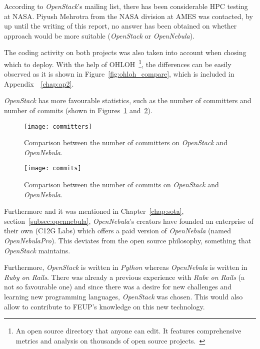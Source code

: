 According to \textit{OpenStack}'s mailing list, there has been considerable HPC testing at NASA. Piyush Mehrotra from the NASA division at AMES was contacted, by up until the writing of this report, no answer has been obtained on whether approach would be more suitable (\textit{OpenStack} or \textit{OpenNebula}).

The coding activity on both projects was also taken into account when chosing which to deploy. With the help of OHLOH~\footnote{An open source directory that anyone can edit. It features comprehensive metrics and analysis on thousands of open source projects.~\cite{ohloh}}, the differences can be easily observed as it is shown in Figure~\ref{fig:ohloh_compare}, which is included in Appendix~~\ref{chap:ap2}.

\textit{OpenStack} has more favourable statistics, such as the number of committers and number of commits (shown in Figures~\ref{fig:committers} and~\ref{fig:commits}).  

\begin{figure}[h]
  \begin{center} 
    \leavevmode 
    \texttt{[image: committers]}
    \caption{Comparison between the number of committers on \textit{OpenStack} and \textit{OpenNebula}.~\cite{ohloh}} 
    \label{fig:committers} 
  \end{center}
\end{figure}

\begin{figure}[h]
  \begin{center}
    \leavevmode
    \texttt{[image: commits]}
    \caption{Comparison between the number of commits on \textit{OpenStack} and \textit{OpenNebula}.~\cite{ohloh}}
    \label{fig:commits}
  \end{center}
\end{figure}

Furthermore and it was mentioned in Chapter~\ref{chap:sota}, section~\ref{subsec:opennebula}, \textit{OpenNebula}'s creators have founded an enterprise of their own (C12G Labs) which offers a paid version of \textit{OpenNebula} (named \textit{OpenNebulaPro}). This deviates from the open source philosophy, something that \textit{OpenStack} maintains. 



Furthermore, \textit{OpenStack} is written in \textit{Python} whereas \textit{OpenNebula} is written in \textit{Ruby on Rails}. There was already a previous experience with \textit{Rube on Rails} (a not so favourable one) and since there was a desire for new challenges and learning new programming languages, \textit{OpenStack} was chosen. This would also allow to contribute to FEUP's knowledge on this new technology.

